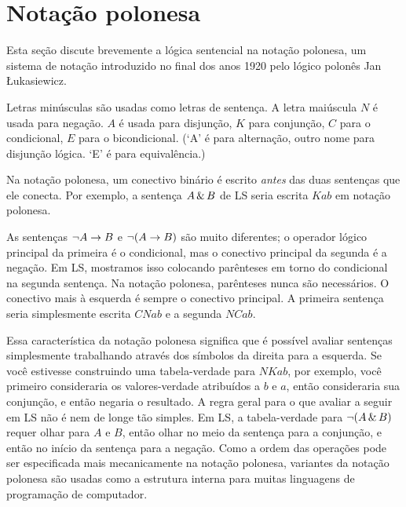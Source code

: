 \section*{Notação polonesa}

Esta seção discute brevemente a lógica sentencial na notação polonesa, um sistema de notação introduzido no final dos anos 1920 pelo lógico polonês Jan {\L}ukasiewicz.

Letras minúsculas são usadas como letras de sentença. A letra maiúscula $N$ é usada para negação. $A$ é usada para disjunção, $K$ para conjunção, $C$ para o condicional, $E$ para o bicondicional. (`A' é para alternação, outro nome para disjunção lógica. `E' é para equivalência.)

Na notação polonesa, um conectivo binário é escrito \emph{antes} das duas sentenças que ele conecta. Por exemplo, a sentença $A\,\&\, B$ de LS seria escrita $Kab$ em notação polonesa.

As sentenças $\neg A\rightarrow B$ e $\neg (A\rightarrow B)$ são muito diferentes; o operador lógico principal da primeira é o condicional, mas o conectivo principal da segunda é a negação. Em LS, mostramos isso colocando parênteses em torno do condicional na segunda sentença. Na notação polonesa, parênteses nunca são necessários. O conectivo mais à esquerda é sempre o conectivo principal. A primeira sentença seria simplesmente escrita $CNab$ e a segunda $NCab$.

Essa característica da notação polonesa significa que é possível avaliar sentenças simplesmente trabalhando através dos símbolos da direita para a esquerda. Se você estivesse construindo uma tabela-verdade para $NKab$, por exemplo, você primeiro consideraria os valores-verdade atribuídos a $b$ e $a$, então consideraria sua conjunção, e então negaria o resultado. A regra geral para o que avaliar a seguir em LS não é nem de longe tão simples. Em LS, a tabela-verdade para $\neg(A\,\&\, B)$ requer olhar para $A$ e $B$, então olhar no meio da sentença para a conjunção, e então no início da sentença para a negação. Como a ordem das operações pode ser especificada mais mecanicamente na notação polonesa, variantes da notação polonesa são usadas como a estrutura interna para muitas linguagens de programação de computador.

